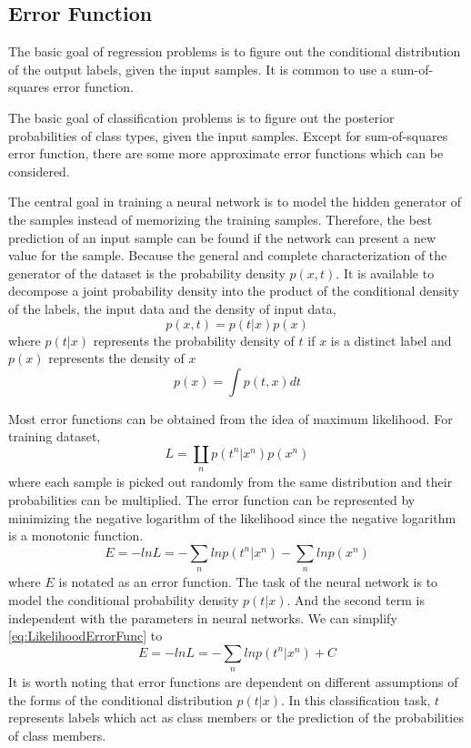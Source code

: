 \subsection{Error Function}

The basic goal of regression problems is to figure out the conditional distribution of the output labels, given the input samples. It is common to use a sum-of-squares error function.

The basic goal of classification problems is to figure out the posterior probabilities of class types, given the input samples. Except for sum-of-squares error function, there are some more approximate error functions which can be considered.

The central goal in training a neural network is to model the hidden generator of the samples instead of memorizing the training samples. Therefore, the best prediction of an input sample can be found if the network can present a new value for the sample. Because the general and complete characterization of the generator of the dataset is the probability density $p(x,t)$. It is available to decompose a joint probability density into the product of the conditional density of the labels, the input data and the density of input data,
\begin{equation}\label{eq:JointProbDensity}
p(x,t) = p(t|x)p(x)
\end{equation}
where $p(t|x)$ represents the probability density of $t$ if $x$ is a distinct label and $p(x)$ represents the density of $x$
\begin{equation}\label{eq:ProbDensityX}
p(x) = \int p(t,x)dt
\end{equation}

Most error functions can be obtained from the idea of maximum likelihood. For training dataset, 
\begin{equation}\label{eq:LikelihoodLoss}
L = \coprod_{\substack{n}}  p(t^n|x^n)p(x^n)
\end{equation}
where each sample is picked out randomly from the same  distribution and their probabilities can be multiplied. The error function can be represented by minimizing the negative logarithm of the likelihood since the negative logarithm is a monotonic function.
\begin{equation}\label{eq:LikelihoodErrorFunc}
E = -ln L = -\sum_{\substack{n}} ln p(t^n|x^n) - \sum_{\substack{n}}lnp(x^n)
\end{equation}
where $E$ is notated as an error function. The task of the neural network is to model the conditional probability density $p(t|x)$. And the second term is independent with the parameters in neural networks.  We can simplify \ref{eq:LikelihoodErrorFunc} to
\begin{equation}\label{eq:SimLikelihoodErrorFunc}
E = -ln L = -\sum_{\substack{n}} ln p(t^n|x^n) + C
\end{equation}
It is worth noting that error functions are dependent on different assumptions of the forms of the conditional distribution $p(t|x)$. In this classification task, $t$ represents labels which act as class members or the prediction of the probabilities of class members.

